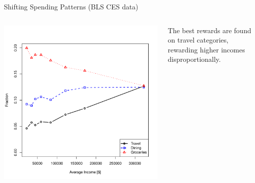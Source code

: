 \begin{frame}{Shifting Spending Patterns (BLS CES data)}
    \begin{columns}[c]
        \begin{column}{0.7\textwidth}
            \includegraphics[width=0.9\textheight]{../Figures/TravelDiningFraction.pdf}
        \end{column}
        \begin{column}{0.3\textwidth}
            \centering
            The best rewards are found on travel categories, rewarding higher incomes disproportionally. 
        \end{column}
    \end{columns}
\end{frame} 

